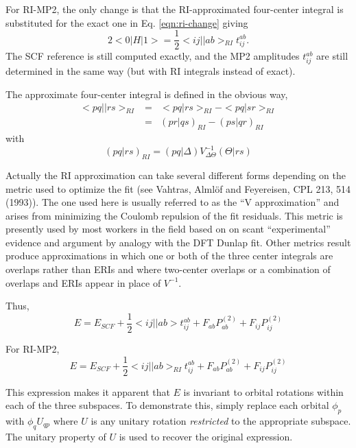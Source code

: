 \documentclass[fleqn,12pt]{article}
\newcommand{\half}{\frac{1}{2}}
\newcommand{\bra}{<\!}
\newcommand{\ket}{\!>}
\newcommand{\tijab}{{t_{ij}^{ab}}}
\newcommand{\Ptwo}{P^{(2)}}
\newcommand{\intari}[2]{\bra #1 || #2 \ket_{RI}}
\newcommand{\intdri}[2]{\bra #1 | #2 \ket_{RI}}
\newcommand{\intmri}[2]{( #1 | #2 )_{RI}}
\begin{document}
\begin{changebar}
For RI-MP2, the only change is that the RI-approximated four-center
integral is substituted for the exact one in Eq. \ref{eqn:ri-change} giving
\begin{equation}
 2 \bra 0 | H | 1 \ket = \half \intari{ij}{ab} \tijab.
\end{equation}
The SCF reference is still computed exactly, and the MP2 amplitudes
$\tijab$ are still determined in the same way (but with RI integrals
instead of exact).

The approximate four-center integral is defined in the obvious way, 
\begin{eqnarray}
\intari{pq}{rs} & = & \intdri{pq}{rs} - \intdri{pq}{sr} \\
                & = & \intmri{pr}{qs} - \intmri{ps}{qr}
\end{eqnarray}
with
\begin{equation}
\intmri{pq}{rs} = (pq|\Delta) V^{-1}_{\Delta\Theta} (\Theta|rs)
\end{equation}

Actually the RI approximation can take several different forms
depending on the metric used to optimize the fit (see Vahtras,
Alml{\"o}f and Feyereisen, CPL 213, 514 (1993)).  The one used here is
usually referred to as the ``V approximation'' and arises from
minimizing the Coulomb repulsion of the fit residuals.  This metric is
presently used by most workers in the field based on on scant
``experimental'' evidence and argument by analogy with the DFT Dunlap
fit.  Other metrics result produce approximations in which one or both
of the three center integrals are overlaps rather than ERIs and where
two-center overlaps or a combination of overlaps and ERIs appear in
place of $V^{-1}$.

\end{changebar}

Thus,
\begin{equation}
\label{eqn:invenergy}
  E = E_{SCF} + \half \bra ij || ab \ket \tijab + 
          F_{ab}\Ptwo_{ab} + F_{ij}\Ptwo_{ij} 
\end{equation}
\begin{changebar}
For RI-MP2,
\begin{displaymath}
\label{eqn:ri-invenergy}
  E = E_{SCF} + \half \intari{ij}{ab} \tijab + 
          F_{ab}\Ptwo_{ab} + F_{ij}\Ptwo_{ij} 
\end{displaymath}
\end{changebar}
This expression makes it apparent that $E$ is invariant to orbital
rotations within each of the three subspaces.  To demonstrate this,
simply replace each orbital $\phi_p$ with $\phi_q U_{qp}$ where $U$ is
any unitary rotation {\em restricted} to the appropriate subspace.
The unitary property of $U$ is used to recover the original
expression.
\end{document}
